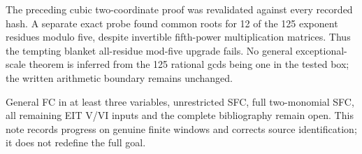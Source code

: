\documentclass[11pt]{article}
\begin{document}
The preceding cubic two-coordinate proof was revalidated against every
recorded hash. A separate exact probe found common roots for 12 of the
125 exponent residues modulo five, despite invertible fifth-power
multiplication matrices. Thus the tempting blanket all-residue mod-five
upgrade fails. No general exceptional-scale theorem is inferred from the
125 rational gcds being one in the tested box; the written arithmetic
boundary remains unchanged.

General FC in at least three variables, unrestricted SFC, full two-monomial
SFC, all remaining EIT V/VI inputs and the complete bibliography remain
open. This note records progress on genuine finite windows and corrects
source identification; it does not redefine the full goal.
\end{document}
